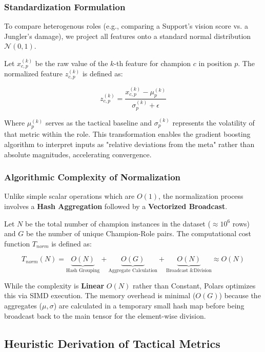 \documentclass[12pt, a4paper]{article}
\begin{document}
    \subsubsection{Standardization Formulation}
    To compare heterogenous roles (e.g., comparing a Support's vision score vs. a Jungler's damage), we project all features onto a standard normal distribution $\mathcal{N}(0, 1)$.

    Let $x_{c,p}^{(k)}$ be the raw value of the $k$-th feature for champion $c$ in position $p$. The normalized feature $z_{c,p}^{(k)}$ is defined as:

    \begin{equation}
        z_{c,p}^{(k)} = \frac{x_{c,p}^{(k)} - \mu_{p}^{(k)}}{\sigma_{p}^{(k)} + \epsilon}
    \end{equation}

    Where $\mu_p^{(k)}$ serves as the tactical baseline and $\sigma_p^{(k)}$ represents the volatility of that metric within the role. This transformation enables the gradient boosting algorithm to interpret inputs as "relative deviations from the meta" rather than absolute magnitudes, accelerating convergence.

    \subsubsection{Algorithmic Complexity of Normalization}
    Unlike simple scalar operations which are $O(1)$, the normalization process involves a \textbf{Hash Aggregation} followed by a \textbf{Vectorized Broadcast}.

    Let $N$ be the total number of champion instances in the dataset ($\approx 10^6$ rows) and $G$ be the number of unique Champion-Role pairs. The computational cost function $T_{norm}$ is defined as:

    \begin{equation}
        T_{norm}(N) = \underbrace{O(N)}_{\text{Hash Grouping}} + \underbrace{O(G)}_{\text{Aggregate Calculation}} + \underbrace{O(N)}_{\text{Broadcast \& Division}} \approx O(N)
    \end{equation}

    While the complexity is \textbf{Linear} $O(N)$ rather than Constant, Polars optimizes this via SIMD execution. The memory overhead is minimal ($O(G)$) because the aggregates ($\mu, \sigma$) are calculated in a temporary small hash map before being broadcast back to the main tensor for the element-wise division.

    \subsection{Heuristic Derivation of Tactical Metrics}
\end{document}
